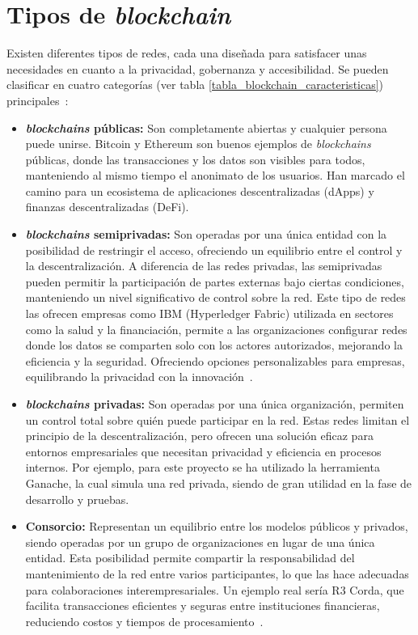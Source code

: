\section{Tipos de \textit{blockchain}}

Existen diferentes tipos de redes, cada una diseñada para satisfacer unas necesidades en cuanto a la privacidad, gobernanza y accesibilidad. 
Se pueden clasificar en cuatro categorías (ver tabla \ref{tabla_blockchain_caracteristicas}) principales~\cite{introducciónBlockchain}:

\begin{itemize}
\item \textbf{\textit{blockchains} públicas:} Son completamente abiertas y cualquier persona puede unirse. Bitcoin y Ethereum son buenos ejemplos de \textit{blockchains} públicas, donde las transacciones y los datos son visibles para todos, manteniendo al mismo tiempo el anonimato de los usuarios. Han marcado el camino para un ecosistema de aplicaciones descentralizadas (dApps) y finanzas descentralizadas (DeFi).

\item \textbf{\textit{blockchains} semiprivadas:} Son operadas por una única entidad con la posibilidad de restringir el acceso, ofreciendo un equilibrio entre el control y la descentralización. A diferencia de las redes privadas, las semiprivadas pueden permitir la participación de partes externas bajo ciertas condiciones, manteniendo un nivel significativo de control sobre la red.
Este tipo de redes las ofrecen empresas como IBM (Hyperledger Fabric) utilizada en sectores como la salud y la financiación, permite a las organizaciones configurar redes donde los datos se comparten solo con los actores autorizados, mejorando la eficiencia y la seguridad. Ofreciendo opciones personalizables para empresas, equilibrando la privacidad con la innovación~\cite{Hyperledger}.

\item \textbf{\textit{blockchains} privadas:} Son operadas por una única organización, permiten un control total sobre quién puede participar en la red. Estas redes limitan el principio de la descentralización, pero ofrecen una solución eficaz para entornos empresariales que necesitan privacidad y eficiencia en procesos internos.
Por ejemplo, para este proyecto se ha utilizado la herramienta Ganache, la cual simula una red privada, siendo de gran utilidad en la fase de desarrollo y pruebas.

\item \textbf{Consorcio:} Representan un equilibrio entre los modelos públicos y privados, siendo operadas por un grupo de organizaciones en lugar de una única entidad. Esta posibilidad permite compartir la responsabilidad del mantenimiento de la red entre varios participantes, lo que las hace adecuadas para colaboraciones interempresariales. 
Un ejemplo real sería R3 Corda, que facilita transacciones eficientes y seguras entre instituciones financieras, reduciendo costos y tiempos de procesamiento~\cite{R3Corda}.

\end{itemize} 


